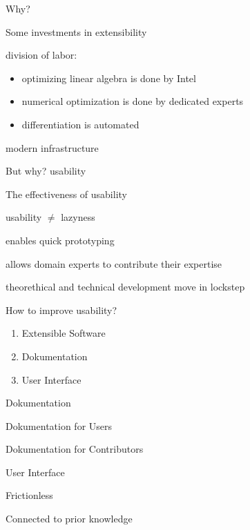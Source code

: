 \documentclass{beamer}
\newenvironment{wideitemize}{
    \itemize\addtolength{\itemsep}{15pt}\addtolength{\topsep}{10pt}}{\enditemize}
\begin{document}
    \begin{frame}{Why?}
        \begin{wideitemize}
        \item Some investments in extensibility
        \item division of labor: \begin{itemize}
            \item optimizing linear algebra is done by Intel
            \item numerical optimization is done by dedicated experts
            \item differentiation is automated
        \end{itemize}
        \item modern infrastructure
        \end{wideitemize}
    \end{frame}

    \begin{frame}{But why?}
    \centering \huge usability
    \end{frame}

    \begin{frame}{The effectiveness of usability}
      \begin{wideitemize}
        \item usability $\neq$ lazyness
        \item enables quick prototyping
        \item allows domain experts to contribute their expertise
        \item theorethical and technical development move in lockstep
      \end{wideitemize}
    \end{frame}

    \begin{frame}{How to improve usability?}
      \begin{enumerate}
        \item Extensible Software
        \item Dokumentation
        \item User Interface
      \end{enumerate}
    \end{frame}

    \begin{frame}{Dokumentation}
      \begin{wideitemize}
        \item Dokumentation for Users
        \item Dokumentation for Contributors
      \end{wideitemize}
    \end{frame}

    \begin{frame}{User Interface}
      \begin{wideitemize}
        \item Frictionless
        \item Connected to prior knowledge
      \end{wideitemize}
    \end{frame}
\end{document}
